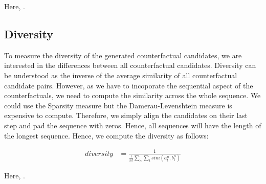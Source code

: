 \documentclass[./../../paper.tex]{subfiles}
\begin{document}
Here, .

\subsection{Diversity}
To measure the diversity of the generated counterfactual candidates, we are interested in the differences between all counterfactual candidates. Diversity can be understood as the inverse of the average similarity of all counterfactual candidate pairs. However, as we have to incoporate the sequential aspect of the counterfactuals, we need to compute the similarity across the whole sequence. We could use the Sparsity measure but the Damerau-Levenshtein measure is expensive to compute. Therefore, we simply align the candidates on their last step and pad the sequence with zeros. Hence, all sequences will have the length of the longest sequence. Hence, we compute the diversity as follows:

\begin{align}
    diversity  & = \frac{1}{\frac{1}{nt} \sum_{n}\sum_{t} sim(a_t^n, b_t^n)  }  
\end{align}

Here, .
\end{document}
